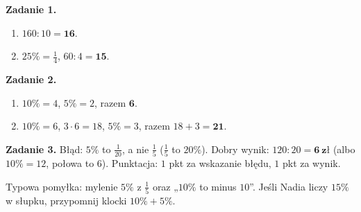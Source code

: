 \documentclass[11pt,a4paper]{article}
\begin{document}

\vspace{0.6em}
\textbf{Zadanie 1.}
\begin{enumerate}[label=\alph*), leftmargin=*, itemsep=4pt]
  \item $160:10=\mathbf{16}$.
  \item $25\%=\frac{1}{4}$, $60:4=\mathbf{15}$.
\end{enumerate}

\textbf{Zadanie 2.}
\begin{enumerate}[label=\alph*), leftmargin=*, itemsep=4pt]
  \item $10\%=4$, $5\%=2$, razem $\mathbf{6}$.
  \item $10\%=6$, $3\cdot 6=18$, $5\%=3$, razem $18+3=\mathbf{21}$.
\end{enumerate}

\textbf{Zadanie 3.} Błąd: $5\%$ to $\frac{1}{20}$, a nie $\frac{1}{5}$ ($\frac{1}{5}$ to $20\%$). Dobry wynik: $120:20=\mathbf{6\ zł}$ (albo $10\%=12$, połowa to $6$). Punktacja: $1$ pkt za wskazanie błędu, $1$ pkt za wynik.

\vspace{0.6em}
\begin{tcolorbox}[colback=white, colframe=okres, boxrule=0.6pt, arc=2pt, title=Wskazówka dla Pawła]
Typowa pomyłka: mylenie $5\%$ z $\frac{1}{5}$ oraz „$10\%$ to minus $10$”. Jeśli Nadia liczy $15\%$ w słupku, przypomnij klocki $10\%+5\%$.
\end{tcolorbox}
\end{document}
